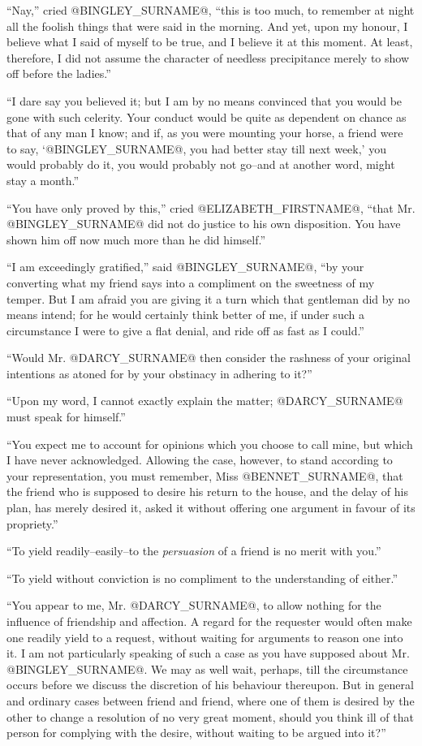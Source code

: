 ``Nay,'' cried @BINGLEY_SURNAME@, ``this is too much, to remember at night all the
foolish things that were said in the morning. And yet, upon my honour,
I believe what I said of myself to be true, and I believe it at this
moment. At least, therefore, I did not assume the character of needless
precipitance merely to show off before the ladies.''

``I dare say you believed it; but I am by no means convinced that
you would be gone with such celerity. Your conduct would be quite as
dependent on chance as that of any man I know; and if, as you were
mounting your horse, a friend were to say, `@BINGLEY_SURNAME@, you had better
stay till next week,' you would probably do it, you would probably not
go--and at another word, might stay a month.''

``You have only proved by this,'' cried @ELIZABETH_FIRSTNAME@, ``that Mr. @BINGLEY_SURNAME@ did
not do justice to his own disposition. You have shown him off now much
more than he did himself.''

``I am exceedingly gratified,'' said @BINGLEY_SURNAME@, ``by your converting what my
friend says into a compliment on the sweetness of my temper. But I am
afraid you are giving it a turn which that gentleman did by no means
intend; for he would certainly think better of me, if under such a
circumstance I were to give a flat denial, and ride off as fast as I
could.''

``Would Mr. @DARCY_SURNAME@ then consider the rashness of your original intentions
as atoned for by your obstinacy in adhering to it?''

``Upon my word, I cannot exactly explain the matter; @DARCY_SURNAME@ must speak for
himself.''

``You expect me to account for opinions which you choose to call mine,
but which I have never acknowledged. Allowing the case, however, to
stand according to your representation, you must remember, Miss @BENNET_SURNAME@,
that the friend who is supposed to desire his return to the house, and
the delay of his plan, has merely desired it, asked it without offering
one argument in favour of its propriety.''

``To yield readily--easily--to the \textit{persuasion} of a friend is no merit
with you.''

``To yield without conviction is no compliment to the understanding of
either.''

``You appear to me, Mr. @DARCY_SURNAME@, to allow nothing for the influence of
friendship and affection. A regard for the requester would often make
one readily yield to a request, without waiting for arguments to reason
one into it. I am not particularly speaking of such a case as you have
supposed about Mr. @BINGLEY_SURNAME@. We may as well wait, perhaps, till the
circumstance occurs before we discuss the discretion of his behaviour
thereupon. But in general and ordinary cases between friend and friend,
where one of them is desired by the other to change a resolution of no
very great moment, should you think ill of that person for complying
with the desire, without waiting to be argued into it?''

